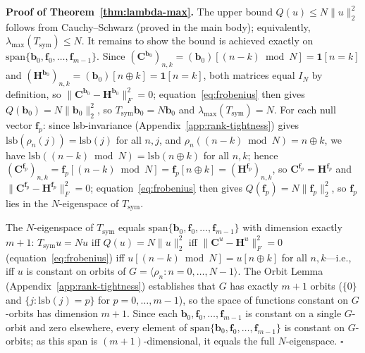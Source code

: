\documentclass[11pt]{article}
\begin{document}
\medskip
\noindent\textbf{Proof of Theorem~\ref{thm:lambda-max}.}
The upper bound $Q(u) \leq N\|u\|_2^2$ follows from Cauchy--Schwarz (proved in the main body); equivalently, $\lambda_{\max}(T_{\mathrm{sym}}) \leq N$. It remains to show the bound is achieved exactly on $\mathrm{span}\{\mathbf{b}_0, \mathbf{f}_0, \ldots, \mathbf{f}_{m-1}\}$. Since $(\mathbf{C}^{\mathbf{b}_0})_{n,k} = (\mathbf{b}_0)[(n-k)\bmod N] = \mathbf{1}[n=k]$ and $(\mathbf{H}^{\mathbf{b}_0})_{n,k} = (\mathbf{b}_0)[n\oplus k] = \mathbf{1}[n=k]$, both matrices equal $I_N$ by definition, so $\|\mathbf{C}^{\mathbf{b}_0}-\mathbf{H}^{\mathbf{b}_0}\|_F^2 = 0$; equation~\eqref{eq:frobenius} then gives $Q(\mathbf{b}_0) = N\|\mathbf{b}_0\|_2^2$, so $T_{\mathrm{sym}}\mathbf{b}_0 = N\mathbf{b}_0$ and $\lambda_{\max}(T_{\mathrm{sym}}) = N$. For each null vector $\mathbf{f}_p$: since lsb-invariance (Appendix~\ref{app:rank-tightness}) gives $\mathrm{lsb}(\rho_n(j)) = \mathrm{lsb}(j)$ for all $n,j$, and $\rho_n((n-k)\bmod N) = n\oplus k$, we have $\mathrm{lsb}((n-k)\bmod N) = \mathrm{lsb}(n\oplus k)$ for all $n,k$; hence $(\mathbf{C}^{\mathbf{f}_p})_{n,k} = \mathbf{f}_p[(n-k)\bmod N] = \mathbf{f}_p[n\oplus k] = (\mathbf{H}^{\mathbf{f}_p})_{n,k}$, so $\mathbf{C}^{\mathbf{f}_p} = \mathbf{H}^{\mathbf{f}_p}$ and $\|\mathbf{C}^{\mathbf{f}_p}-\mathbf{H}^{\mathbf{f}_p}\|_F^2 = 0$; equation~\eqref{eq:frobenius} then gives $Q(\mathbf{f}_p) = N\|\mathbf{f}_p\|_2^2$, so $\mathbf{f}_p$ lies in the $N$-eigenspace of $T_{\mathrm{sym}}$.

\medskip
The $N$-eigenspace of $T_{\mathrm{sym}}$ equals $\mathrm{span}\{\mathbf{b}_0, \mathbf{f}_0, \ldots, \mathbf{f}_{m-1}\}$ with dimension exactly $m+1$: $T_{\mathrm{sym}} u = Nu$ iff $Q(u) = N\|u\|_2^2$ iff $\|\mathbf{C}^u - \mathbf{H}^u\|_F^2 = 0$ (equation~\eqref{eq:frobenius}) iff $u[(n-k)\bmod N] = u[n\oplus k]$ for all $n,k$---i.e., iff $u$ is constant on orbits of $G = \langle\rho_n : n=0,\ldots,N-1\rangle$. The Orbit Lemma (Appendix~\ref{app:rank-tightness}) establishes that $G$ has exactly $m+1$ orbits ($\{0\}$ and $\{j:\mathrm{lsb}(j)=p\}$ for $p=0,\ldots,m-1$), so the space of functions constant on $G$-orbits has dimension $m+1$. Since each $\mathbf{b}_0, \mathbf{f}_0, \ldots, \mathbf{f}_{m-1}$ is constant on a single $G$-orbit and zero elsewhere, every element of $\mathrm{span}\{\mathbf{b}_0, \mathbf{f}_0, \ldots, \mathbf{f}_{m-1}\}$ is constant on $G$-orbits; as this span is $(m+1)$-dimensional, it equals the full $N$-eigenspace. $\square$
\end{document}
